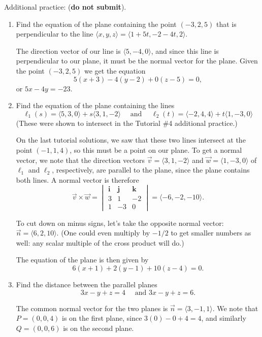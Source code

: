 \documentclass[12pt]{article}
\renewcommand{\i}{\mathbf{i}}
\renewcommand{\j}{\mathbf{j}}
\renewcommand{\k}{\mathbf{k}}
\newcommand{\bvm}{\begin{vmatrix}}
\newcommand{\evm}{\end{vmatrix}}
\begin{document}
  Additional practice: (\textbf{do not submit}).
\begin{enumerate}
\item Find the equation of the plane containing the point $(-3,2,5)$ that is perpendicular to the line $\langle x,y,z\rangle = \langle 1+5t,-2-4t,2\rangle$.

\bigskip

The direction vector of our line is $\langle 5,-4,0\rangle$, and since this line is perpendicular to our plane, it must be the normal vector for the plane. Given the point $(-3,2,5)$ we get the equation
\[
5(x+3)-4(y-2)+0(z-5)=0,
\]
or $5x-4y=-23$.

\item Find the equation of the plane containing the lines 
\[
\ell_1(s)  = \langle 5,3,0\rangle + s\langle 3,1,-2\rangle\quad\text{ and } \quad
\ell_2(t)  = \langle -2,4,4\rangle+t\langle 1,-3,0\rangle
\]
(These were shown to intersect in the Tutorial \#4 additional practice.)

\bigskip

On the last tutorial solutions, we saw that these two lines intersect at the point $(-1,1,4)$, so this must be a point on our plane. To get a normal vector, we note that the direction vectors $\vec{v}=\langle 3,1,-2\rangle$ and $\vec{w}=\langle 1,-3,0\rangle$ of $\ell_1$ and $\ell_2$, respectively, are parallel to the plane, since the plane contains both lines. A normal vector is therefore
\[
\vec{v}\times\vec{w}=\bvm \i&\j&\k\\
									3&1&-2\\
									1&-3&0\evm = \langle -6, -2, -10\rangle.
\]

To cut down on minus signs, let's take the opposite normal vector: $\vec{n}=\langle 6,2,10\rangle$. (One could even multiply by $-1/2$ to get smaller numbers as well: any scalar multiple of the cross product will do.)

The equation of the plane is then given by
\[
6(x+1)+2(y-1)+10(z-4)=0.
\]

\item Find the distance between the parallel planes
\[
3x-y+z=4 \quad \text{ and } 3x-y+z=6.
\]

The common normal vector for the two planes is $\vec{n}=\langle 3,-1,1\rangle$. We note that $P=(0,0,4)$ is on the first plane, since $3(0)-0+4=4$, and similarly $Q=(0,0,6)$ is on the second plane.


\end{enumerate}
\end{document}
